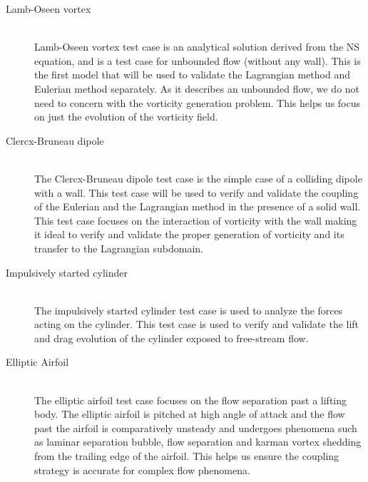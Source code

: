 	\begin{description}
	\item[Lamb-Oseen vortex] \cite{Lamb1993} \cite{Tryggeson2007} \hfill\\
	Lamb-Oseen vortex test case is an analytical solution derived from the NS equation, and is a test case for unbounded flow (without any wall). This is the first model that will be used to validate the Lagrangian method and Eulerian method separately. As it describes an unbounded flow, we do not need to concern with the vorticity generation problem. This helps us focus on just the evolution of the vorticity field.
	\item[Clercx-Bruneau dipole] \cite{Clercx2006a}\hfill\\
	The Clercx-Bruneau dipole test case is the simple case of a colliding dipole with a wall. This test case will be used to verify and validate the coupling of the Eulerian and the Lagrangian method in the presence of a solid wall. This test case focuses on the interaction of vorticity with the wall making it ideal to verify and validate the proper generation of vorticity and its transfer to the Lagrangian subdomain.
	\item[Impulsively started cylinder] \cite{Koumoutsakos1995a} \cite{Chang1991} \cite{Braza1986} \cite{Lecointe1984}\hfill\\
	The impulsively started cylinder test case is used to analyze the forces acting on the cylinder. This test case is used to verify and validate the lift and drag evolution of the cylinder exposed to free-stream flow.
	\item[Elliptic Airfoil] \cite{Nair1997a}\hfill\\
	The elliptic airfoil test case focuses on the flow separation past a lifting body. The elliptic airfoil is pitched at high angle of attack and the flow past the airfoil is comparatively unsteady and undergoes phenomena such as laminar separation bubble, flow separation and karman vortex shedding from the trailing edge of the airfoil. This helps us ensure the coupling strategy is accurate for complex flow phenomena.
	\end{description}

